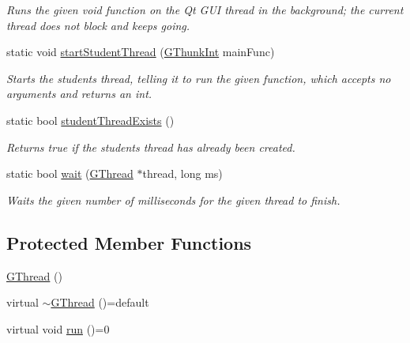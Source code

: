 \begin{DoxyCompactItemize}
\begin{DoxyCompactList}\small\item\em Runs the given void function on the Qt G\+UI thread in the background; the current thread does not block and keeps going. \end{DoxyCompactList}\item 
static void \mbox{\hyperlink{classsgl_1_1GThread_a7d68a5d8a6557bb824cf2568240a1aef}{start\+Student\+Thread}} (\mbox{\hyperlink{namespacesgl_a2c46348e6e6dbf761bcceddb93945ac3}{G\+Thunk\+Int}} main\+Func)
\begin{DoxyCompactList}\small\item\em Starts the student\textquotesingle{}s thread, telling it to run the given function, which accepts no arguments and returns an int. \end{DoxyCompactList}\item 
static bool \mbox{\hyperlink{classsgl_1_1GThread_af75b92d7df24cf0e2f06193944b9db32}{student\+Thread\+Exists}} ()
\begin{DoxyCompactList}\small\item\em Returns true if the student\textquotesingle{}s thread has already been created. \end{DoxyCompactList}\item 
static bool \mbox{\hyperlink{classsgl_1_1GThread_a231df01e3224a1c4a109613a891f554e}{wait}} (\mbox{\hyperlink{classsgl_1_1GThread}{G\+Thread}} $\ast$thread, long ms)
\begin{DoxyCompactList}\small\item\em Waits the given number of milliseconds for the given thread to finish. \end{DoxyCompactList}\end{DoxyCompactItemize}
\subsection*{Protected Member Functions}
\begin{DoxyCompactItemize}
\item 
\mbox{\hyperlink{classsgl_1_1GThread_a7db4904140090c18f864e09283f2b529}{G\+Thread}} ()
\item 
virtual \mbox{\hyperlink{classsgl_1_1GThread_ae4f0a2859df75533269d8916c361855d}{$\sim$\+G\+Thread}} ()=default
\item 
virtual void \mbox{\hyperlink{classsgl_1_1GThread_a18954417d3124a8095783ea13dc6d00b}{run}} ()=0
\end{DoxyCompactItemize}
